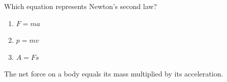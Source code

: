 

\makematerialtitle

\begin{problem}
Which equation represents Newton's second law?
\begin{enumerate}[label=\Alph*.]
  \item $F = ma$
  \item $p = mv$
  \item $A = Fs$
\end{enumerate}
\begin{solution}
The net force on a body equals its mass multiplied by its acceleration.
\end{solution}
\end{problem}


